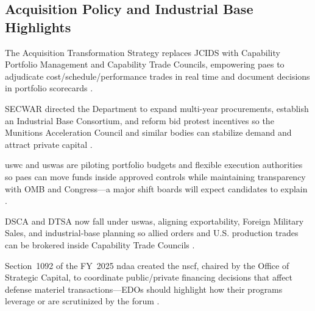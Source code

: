 \documentclass[../main.tex]{subfiles}
\begin{document}
\subsection{Acquisition Policy and Industrial Base Highlights}
\begin{description}[style=nextline,labelsep=0.5em,font=\bfseries]
  \item[\textbf{Warfighting Acquisition System (WAS).}] The Acquisition Transformation Strategy replaces JCIDS with Capability Portfolio Management and Capability Trade Councils, empowering \acp{pae} to adjudicate cost/schedule/performance trades in real time and document decisions in portfolio scorecards \autocite{secwar-acq-transformation-2025}.
  \item[\textbf{Industrial base actions.}] SECWAR directed the Department to expand multi-year procurements, establish an Industrial Base Consortium, and reform bid protest incentives so the Munitions Acceleration Council and similar bodies can stabilize demand and attract private capital \autocite{secwar-acq-transformation-2025}.
  \item[\textbf{PPBE integration.}] \ac{uswc} and \ac{uswas} are piloting portfolio budgets and flexible execution authorities so \acp{pae} can move funds inside approved controls while maintaining transparency with OMB and Congress---a major shift boards will expect candidates to explain \autocite{secwar-acq-transformation-2025}.
  \item[\textbf{Security cooperation realignment.}] DSCA and DTSA now fall under \ac{uswas}, aligning exportability, Foreign Military Sales, and industrial-base planning so allied orders and U.S. production trades can be brokered inside Capability Trade Councils \autocite{secwar-arms-transfer-2025}.
  \item[\textbf{National Security Capital Forum.}] Section~1092 of the FY~2025 \ac{ndaa} created the \ac{nscf}, chaired by the Office of Strategic Capital, to coordinate public/private financing decisions that affect defense materiel transactions---EDOs should highlight how their programs leverage or are scrutinized by the forum \autocite{secwar-nscf-2025}.
\end{description}

\IfSubfilesClassLoaded{}{}
\end{document}
